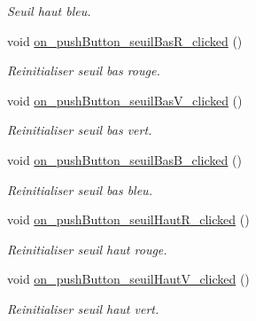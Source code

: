 \begin{DoxyCompactItemize}
\begin{DoxyCompactList}\small\item\em Seuil haut bleu. \end{DoxyCompactList}\item 
\mbox{\label{classMainWindow_a5818966b3d0af54935e5bd1675c94665}} 
void \hyperlink{classMainWindow_a5818966b3d0af54935e5bd1675c94665}{on\+\_\+push\+Button\+\_\+seuil\+Bas\+R\+\_\+clicked} ()
\begin{DoxyCompactList}\small\item\em Reinitialiser seuil bas rouge. \end{DoxyCompactList}\item 
\mbox{\label{classMainWindow_ad0e42a59ec6774929767d0897ce195ba}} 
void \hyperlink{classMainWindow_ad0e42a59ec6774929767d0897ce195ba}{on\+\_\+push\+Button\+\_\+seuil\+Bas\+V\+\_\+clicked} ()
\begin{DoxyCompactList}\small\item\em Reinitialiser seuil bas vert. \end{DoxyCompactList}\item 
\mbox{\label{classMainWindow_addb0990dd617b755d2e14481b032fe1c}} 
void \hyperlink{classMainWindow_addb0990dd617b755d2e14481b032fe1c}{on\+\_\+push\+Button\+\_\+seuil\+Bas\+B\+\_\+clicked} ()
\begin{DoxyCompactList}\small\item\em Reinitialiser seuil bas bleu. \end{DoxyCompactList}\item 
\mbox{\label{classMainWindow_a0955f000872ed7a2b3d8e14f4de65f15}} 
void \hyperlink{classMainWindow_a0955f000872ed7a2b3d8e14f4de65f15}{on\+\_\+push\+Button\+\_\+seuil\+Haut\+R\+\_\+clicked} ()
\begin{DoxyCompactList}\small\item\em Reinitialiser seuil haut rouge. \end{DoxyCompactList}\item 
\mbox{\label{classMainWindow_a330bc9f755ba342c39bb8473154307a4}} 
void \hyperlink{classMainWindow_a330bc9f755ba342c39bb8473154307a4}{on\+\_\+push\+Button\+\_\+seuil\+Haut\+V\+\_\+clicked} ()
\begin{DoxyCompactList}\small\item\em Reinitialiser seuil haut vert. \end{DoxyCompactList}\item 

\end{DoxyCompactItemize}

